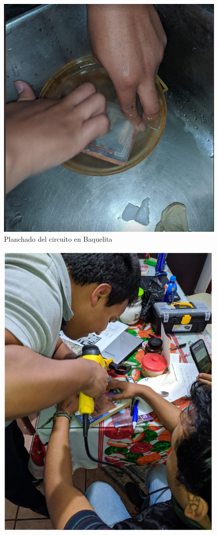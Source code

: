 \documentclass[10pt,a4paper]{article}
\begin{document}
\begin{multicols}{2}
\begin{itemize}
\begin{figure}[H]
\centering
\includegraphics[scale=0.4]{anex.PNG}
\caption{Planchado del circuito en Baquelita}
\end{figure}
\begin{figure}[H]
\centering
\includegraphics[scale=0.4]{anexito.PNG}

\end{figure}
\end{itemize}
\end{multicols}
\end{document}

